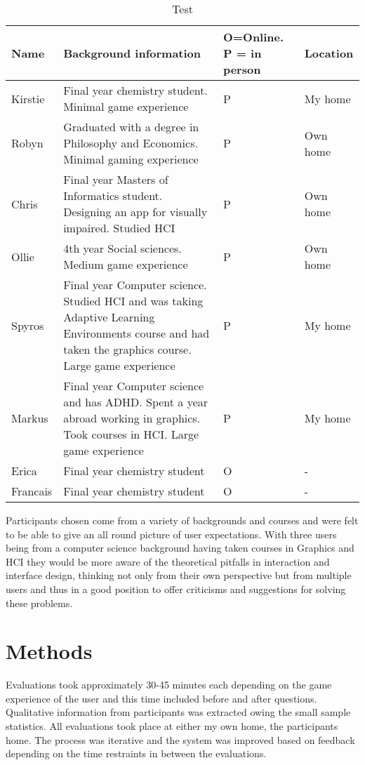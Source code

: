 \documentclass[11pt]{report}
\begin{document}
\begin{table}[H]
    \begin{tabular}{| p{2cm} | p{9cm} | p{3cm} | p{3cm} |}
    \hline
    Name & Background information & O=Online. P = in person & Location \\
    \hline
    \hline
    Kirstie & Final year chemistry student. Minimal game experience & P & My home\\ \hline
    Robyn & Graduated with a degree in Philosophy and Economics. Minimal gaming experience & P & Own home \\ \hline
    Chris & Final year Masters of Informatics student. Designing an app for visually impaired. Studied HCI & P & Own home \\ \hline
    Ollie & 4th year Social sciences. Medium game experience & P & Own home \\ \hline
    Spyros & Final year Computer science. Studied HCI and was taking Adaptive Learning Environments course and had taken the graphics course. Large game experience & P & My home \\ \hline
    Markus & Final year Computer science and has ADHD. Spent a year abroad working in graphics. Took courses in HCI. Large game experience & P & My home \\ \hline
    Erica & Final year chemistry student & O & -\\ \hline
    Francais & Final year chemistry student & O & - \\ \hline
    \end{tabular}
    \caption{Test}
\end{table}

Participants chosen come from a variety of backgrounds and courses and were felt to be able to give an all round picture of user expectations. With three users being from a computer science background having taken courses in Graphics and HCI they would be more aware of the theoretical pitfalls in interaction and interface design, thinking not only from their own perspective but from multiple users and thus in a good position to offer criticisms and suggestions for solving these problems.

\section{Methods}

Evaluations took approximately 30-45 minutes each depending on the game experience of the user and this time included before and after questions. Qualitative information from participants was extracted owing the small sample statistics. All evaluations took place at either my own home, the participants home. The process was iterative and the system was improved based on feedback depending on the time restraints in between the evaluations.  
\end{document}
